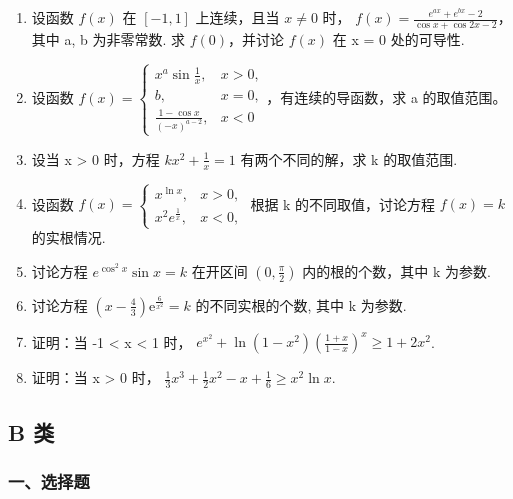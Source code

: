 \documentclass[12pt, a4paper]{ctexart}
\begin{document}
\begin{enumerate}[start=65]
    \item 设函数 $ f(x) $ 在 $ [-1,1] $ 上连续，且当 $ x \neq 0 $ 时， $ f(x) = \frac{e^{ax} + e^{bx} - 2}{\cos x + \cos 2x - 2} $，其中 a, b 为非零常数. 求 $ f(0) $，并讨论 $ f(x) $ 在 x = 0 处的可导性.

    \item 设函数 $ f(x)=\begin{cases}x^{a}\sin\frac{1}{x},&x>0,\\b,&x=0,\\\frac{1-\cos x}{(-x)^{a-2}},&x<0\end{cases} $，有连续的导函数，求 a 的取值范围。

    \item 设当 x > 0 时，方程 $ kx^{2} + \frac{1}{x} = 1 $ 有两个不同的解，求 k 的取值范围.

    \item 设函数 $ f(x)=\begin{cases}x^{\ln x}, & x>0, \\ x^{2}e^{\frac{1}{x}}, & x<0,\end{cases} $ 根据 k 的不同取值，讨论方程 $ f(x)=k $ 的实根情况.

    \item 讨论方程 $ e^{\cos^{2}x}\sin x = k $ 在开区间 $ \left(0, \frac{\pi}{2}\right) $ 内的根的个数，其中 k 为参数.

    \item 讨论方程 $ \left(x-\frac{4}{3}\right)\mathrm{e}^{\frac{6}{x^{2}}}=k $ 的不同实根的个数, 其中 k 为参数.

    \item 证明：当 -1 < x < 1 时， $ e^{x^{2}} + \ln\left(1 - x^{2}\right)\left(\frac{1 + x}{1 - x}\right)^{x}\geq 1 + 2x^{2} $.

    \item 证明：当 x > 0 时， $ \frac{1}{3}x^{3} + \frac{1}{2}x^{2} - x + \frac{1}{6} \geq x^{2} \ln x $.
\end{enumerate}

\subsection{B 类}

\subsubsection*{一、选择题}
\end{document}
